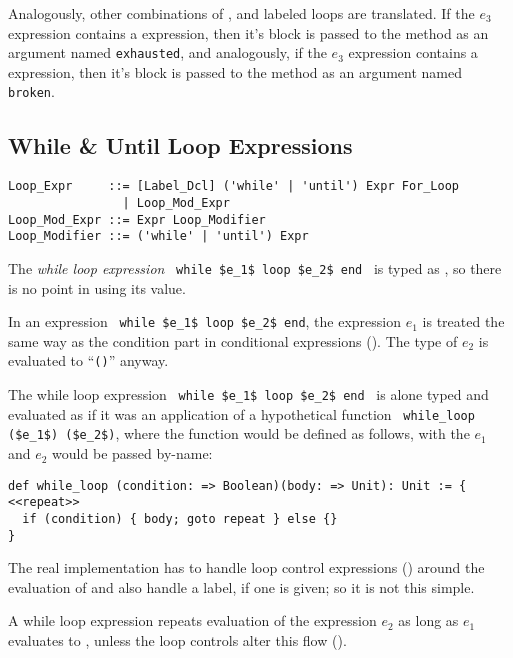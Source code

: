 Analogously, other combinations of ,  and labeled loops are translated. If the $e_3$ expression contains a  expression, then it's block is passed to the  method as an argument named \lstinline[deletekeywords={exhausted}]{exhausted}, and analogously, if the $e_3$ expression contains a  expression, then it's block is passed to the  method as an argument named \lstinline[deletekeywords={broken}]{broken}.







\subsection{While \& Until Loop Expressions}

\syntax\begin{lstlisting}
Loop_Expr     ::= [Label_Dcl] ('while' | 'until') Expr For_Loop
                | Loop_Mod_Expr
Loop_Mod_Expr ::= Expr Loop_Modifier
Loop_Modifier ::= ('while' | 'until') Expr
\end{lstlisting}

The {\em while loop expression} ~\lstinline!while $e_1$ loop $e_2$ end!~ is typed as , so there is no point in using its value. 

In an expression ~\lstinline!while $e_1$ loop $e_2$ end!, the expression $e_1$ is treated the same way as the condition part in conditional expressions (). The type of $e_2$ is evaluated to ``\lstinline!()!'' anyway.

The while loop expression ~\lstinline!while $e_1$ loop $e_2$ end!~ is alone typed and evaluated as if it was an application of a hypothetical function ~\lstinline!while_loop ($e_1$) ($e_2$)!, where the function  would be defined as follows, with the $e_1$ and $e_2$ would be passed by-name: 
\begin{lstlisting}
def while_loop (condition: => Boolean)(body: => Unit): Unit := {
<<repeat>>
  if (condition) { body; goto repeat } else {}
}
\end{lstlisting}
The real implementation has to handle loop control expressions () around the evaluation of  and also handle a label, if one is given; so it is not this simple. 

A while loop expression repeats evaluation of the expression $e_2$ as long as $e_1$ evaluates to , unless the loop controls alter this flow ().





